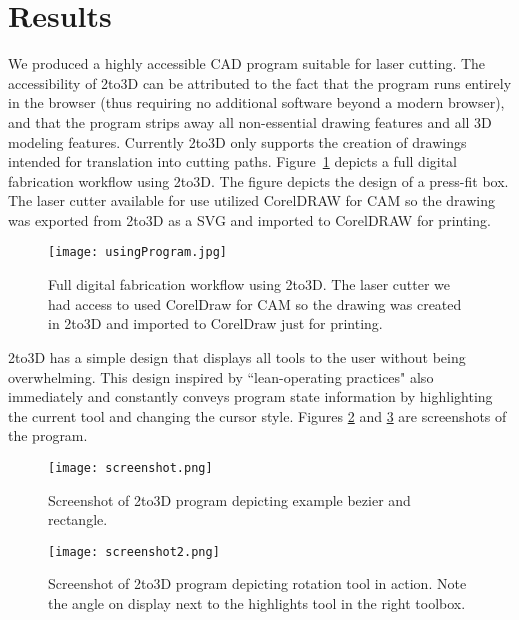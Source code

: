 \section{Results}

We produced a highly accessible CAD program suitable for laser cutting. The accessibility of 2to3D can be attributed to the fact that the program runs entirely in the browser (thus requiring no additional software beyond a modern browser), and that the program strips away all non-essential drawing features and all 3D modeling features. Currently 2to3D only supports the creation of drawings intended for translation into cutting paths. Figure~\ref{fig:usingProgram} depicts a full digital fabrication workflow using 2to3D. The figure depicts the design of a press-fit box. The laser cutter available for use utilized CorelDRAW for CAM so the drawing was exported from 2to3D as a SVG and imported to CorelDRAW for printing.

\begin{figure}[H]
  \texttt{[image: usingProgram.jpg]}
  \caption{Full digital fabrication workflow using 2to3D. The laser cutter we had access to used CorelDraw for CAM so the drawing was created in 2to3D and imported to CorelDraw just for printing.}
  \label{fig:usingProgram}
\end{figure}

2to3D has a simple design that displays all tools to the user without being overwhelming. This design inspired by ``lean-operating practices" also immediately and constantly conveys program state information by highlighting the current tool and changing the cursor style. Figures \ref{fig:screenshot} and \ref{fig:screenshot2} are screenshots of the program.

\begin{figure}[H]
  \texttt{[image: screenshot.png]}
  \caption{Screenshot of 2to3D program depicting example bezier and rectangle.}
  \label{fig:screenshot}
\end{figure}

\begin{figure}[H]
  \texttt{[image: screenshot2.png]}
  \caption{Screenshot of 2to3D program depicting rotation tool in action. Note the angle on display next to the highlights tool in the right toolbox.}
  \label{fig:screenshot2}
\end{figure}

